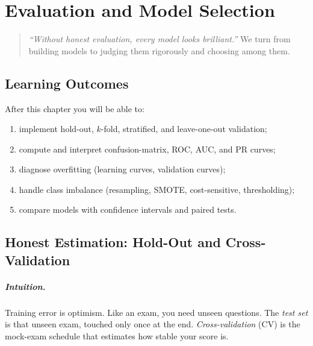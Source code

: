 \chapter{Evaluation and Model Selection}
\label{ch:evaluation}

\begin{quote}
\emph{``Without honest evaluation, every model looks brilliant.''} We turn from building models to judging them rigorously and choosing among them.
\end{quote}

\noindent{}
\vspace{0.4em}

\section*{Learning Outcomes}
After this chapter you will be able to:
\begin{enumerate}[label=(L\arabic*)]
    \item implement hold-out, $k$-fold, stratified, and leave-one-out validation;
    \item compute and interpret confusion-matrix, ROC, AUC, and PR curves;
    \item diagnose overfitting (learning curves, validation curves);
    \item handle class imbalance (resampling, SMOTE, cost-sensitive, thresholding);
    \item compare models with confidence intervals and paired tests.
\end{enumerate}

\section{Honest Estimation: Hold-Out and Cross-Validation}
\label{sec:cv}
\paragraph{Intuition.} Training error is optimism. Like an exam, you need unseen questions. The \emph{test set} is that unseen exam, touched only once at the end. \emph{Cross-validation} (CV) is the mock-exam schedule that estimates how stable your score is.

